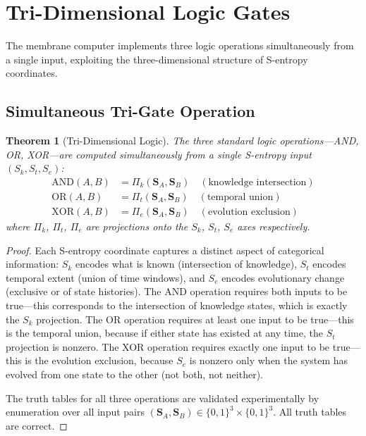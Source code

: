 \documentclass[twocolumn,10pt,a4paper]{article}
\newtheorem{theorem}{Theorem}[section]
\theoremstyle{definition}
\theoremstyle{remark}
\newcommand{\Sentropy}{\mathbf{S}}
\newcommand{\Sk}{S_k}
\newcommand{\St}{S_t}
\newcommand{\Se}{S_e}
\begin{document}
\section{Tri-Dimensional Logic Gates}
\label{sec:logic}

The membrane computer implements three logic operations simultaneously from a single input, exploiting the three-dimensional structure of S-entropy coordinates.

\subsection{Simultaneous Tri-Gate Operation}

\begin{theorem}[Tri-Dimensional Logic]
\label{thm:trilogic}
The three standard logic operations---AND, OR, XOR---are computed simultaneously from a single S-entropy input $(\Sk, \St, \Se)$:
\begin{align}
\text{AND}(A, B) &= \Pi_k(\Sentropy_A, \Sentropy_B) \quad (\text{knowledge intersection}) \label{eq:and} \\
\text{OR}(A, B) &= \Pi_t(\Sentropy_A, \Sentropy_B) \quad (\text{temporal union}) \label{eq:or} \\
\text{XOR}(A, B) &= \Pi_e(\Sentropy_A, \Sentropy_B) \quad (\text{evolution exclusion}) \label{eq:xor}
\end{align}
where $\Pi_k$, $\Pi_t$, $\Pi_e$ are projections onto the $\Sk$, $\St$, $\Se$ axes respectively.
\end{theorem}

\begin{proof}
Each S-entropy coordinate captures a distinct aspect of categorical information: $\Sk$ encodes what is known (intersection of knowledge), $\St$ encodes temporal extent (union of time windows), and $\Se$ encodes evolutionary change (exclusive or of state histories). The AND operation requires both inputs to be true---this corresponds to the intersection of knowledge states, which is exactly the $\Sk$ projection. The OR operation requires at least one input to be true---this is the temporal union, because if either state has existed at any time, the $\St$ projection is nonzero. The XOR operation requires exactly one input to be true---this is the evolution exclusion, because $\Se$ is nonzero only when the system has evolved from one state to the other (not both, not neither).

The truth tables for all three operations are validated experimentally by enumeration over all input pairs $(\Sentropy_A, \Sentropy_B) \in \{0, 1\}^3 \times \{0, 1\}^3$. All truth tables are correct. \qedhere
\end{proof}
\end{document}
